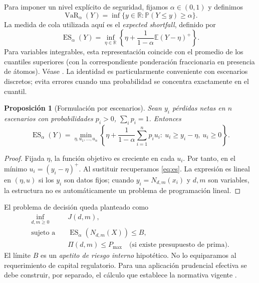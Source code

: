 \documentclass[11pt,reqno]{amsart}
\newtheorem{proposition}[theorem]{Proposición}
\theoremstyle{definition}\newtheorem{definition}[theorem]{Definición}
\theoremstyle{remark}\newtheorem{remark}[theorem]{Observación}
\DeclareMathOperator{\VaR}{VaR}
\DeclareMathOperator{\ES}{ES}
\newcommand{\E}{\mathbb E}
\newcommand{\Prob}{\mathbb P}
\newcommand{\R}{\mathbb R}
\newcommand{\pos}[1]{(#1)^+}
\begin{document}
Para imponer un nivel explícito de seguridad, fijamos $\alpha\in(0,1)$ y definimos
\begin{equation}
\VaR_\alpha(Y)=\inf\{y\in\R:\Prob(Y\le y)\ge\alpha\}.
\end{equation}
La medida de cola utilizada aquí es el \emph{expected shortfall}, definido por
\begin{equation}\label{eq:es}
\ES_\alpha(Y)=\inf_{\eta\in\R}\left\{\eta+\frac{1}{1-\alpha}\E\pos{Y-\eta}\right\}.
\end{equation}
Para variables integrables, esta representación coincide con el promedio de los cuantiles superiores (con la correspondiente ponderación fraccionaria en presencia de átomos). Véase \cite{RockafellarUryasev2000}. La identidad es particularmente conveniente con escenarios discretos; evita errores cuando una probabilidad se concentra exactamente en el cuantil.

\begin{proposition}[Formulación por escenarios]\label{prop:scenario}
Sean $y_i$ pérdidas netas en $n$ escenarios con probabilidades $p_i>0$, $\sum_i p_i=1$. Entonces
\begin{equation}\label{eq:esLP}
\ES_\alpha(Y)=\min_{\eta,u_1,\ldots,u_n}
\left\{\eta+\frac{1}{1-\alpha}\sum_{i=1}^n p_i u_i:
\ u_i\ge y_i-\eta,\ u_i\ge0\right\}.
\end{equation}
\end{proposition}
\begin{proof}
Fijada $\eta$, la función objetivo es creciente en cada $u_i$. Por tanto, en el mínimo $u_i=\pos{y_i-\eta}$. Al sustituir recuperamos \eqref{eq:es}. La expresión es lineal en $(\eta,u)$ si los $y_i$ son datos fijos; cuando $y_i=N_{d,m}(x_i)$ y $d,m$ son variables, la estructura no es automáticamente un problema de programación lineal.
\end{proof}

El problema de decisión queda planteado como
\begin{equation}\label{eq:opt}
\begin{aligned}
\inf_{d,m\ge0}\quad & J(d,m),\\
\text{sujeto a}\quad&\ES_\alpha(N_{d,m}(X))\le B,\\
&\Pi(d,m)\le P_{\max}\quad\text{(si existe presupuesto de prima)}.
\end{aligned}
\end{equation}
El límite $B$ es un \emph{apetito de riesgo interno} hipotético. No lo equiparamos al requerimiento de capital regulatorio. Para una aplicación prudencial efectiva se debe construir, por separado, el cálculo que establece la normativa vigente \cite{CUSF64}.
\end{document}
